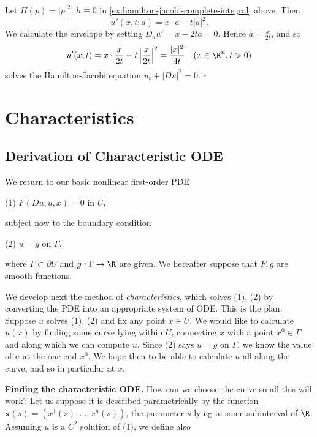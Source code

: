 \begin{example}
\label{ex:hamilton-jacobi-envelope-example}
Let $H(p) = |p|^2$, $h \equiv 0$ in \cref{ex:hamilton-jacobi-complete-integral} above. Then
$$u'(x, t; a) = x \cdot a - t|a|^2.$$
We calculate the envelope by setting $D_a u' = x - 2ta = 0$. Hence $a = \frac{x}{2t}$, and so
$$u'(x, t) = x \cdot \frac{x}{2t} - t\left|\frac{x}{2t}\right|^2 = \frac{|x|^2}{4t} \quad (x \in \R^n, t > 0)$$
solves the Hamilton-Jacobi equation $u_t + |Du|^2 = 0$. $\square$
\end{example}

\section{Characteristics}
\label{sec:characteristics}

\subsection{Derivation of Characteristic ODE}
\label{sec:characteristic-ode-derivation}

We return to our basic nonlinear first-order PDE

(1)	$F(Du, u, x) = 0$ in $U$,

subject now to the boundary condition

(2)	$u = g$ on $\Gamma$,

where $\Gamma \subset \partial U$ and $g : \Gamma \to \R$ are given. We hereafter suppose that $F, g$ are smooth functions.

We develop next the method of \textit{characteristics}, which solves (1), (2) by converting the PDE into an appropriate system of ODE. This is the plan. Suppose $u$ solves (1), (2) and fix any point $x \in U$. We would like to calculate $u(x)$ by finding some curve lying within $U$, connecting $x$ with a point $x^0 \in \Gamma$ and along which we can compute $u$. Since (2) says $u = g$ on $\Gamma$, we know the value of $u$ at the one end $x^0$. We hope then to be able to calculate $u$ all along the curve, and so in particular at $x$.

\textbf{Finding the characteristic ODE.} How can we choose the curve so all this will work? Let us suppose it is described parametrically by the function $\mathbf{x}(s) = (x^1(s), \ldots, x^n(s))$, the parameter $s$ lying in some subinterval of $\R$. Assuming $u$ is a $C^2$ solution of (1), we define also

